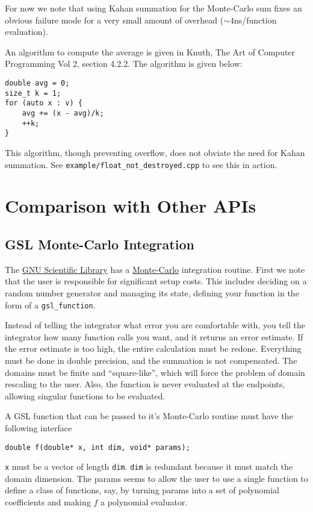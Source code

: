 \documentclass[landscape]{article}
\numberwithin{equation}{section}
\begin{document}
For now we note that using Kahan summation for the Monte-Carlo sum fixes an obvious failure mode for a very small amount of overhead (${\sim}4$ns/function evaluation).

An algorithm to compute the average is given in Knuth, The Art of Computer Programming Vol 2, section 4.2.2.
The algorithm is given below:
\begin{verbatim}
double avg = 0;
size_t k = 1;
for (auto x : v) {
	avg += (x - avg)/k;
	++k;
}
\end{verbatim}
This algorithm, though preventing overflow, does not obviate the need for Kahan summation. See \texttt{example/float\_not\_destroyed.cpp} to see this in action.

\section{Comparison with Other APIs}
\subsection{GSL Monte-Carlo Integration}

The \href{https://www.gnu.org/software/gsl/}{GNU Scientific Library} has a \href{https://www.gnu.org/software/gsl/doc/html/montecarlo.html}{Monte-Carlo} integration routine.
First we note that the user is responsible for significant setup costs.
This includes deciding on a random number generator and managing its state, defining your function in the form of a \texttt{gsl\_function}.

Instead of telling the integrator what error you are comfortable with, you tell the integrator how many function calls you want, and it returns an error estimate.
If the error estimate is too high, the entire calculation must be redone.
Everything must be done in double precision, and the summation is not compensated.
The domains must be finite and ``square-like'', which will force the problem of domain rescaling to the user. Also, the function is never evaluated at the endpoints, allowing singular functions to be evaluated.

A GSL function that can be passed to it's Monte-Carlo routine must have the following interface

\begin{verbatim}
double f(double* x, int dim, void* params);
\end{verbatim}
\texttt{x} must be a vector of length \texttt{dim}.
\texttt{dim} is redundant because it must match the domain dimension.
The params seems to allow the user to use a single function to define a class of functions, say, by turning params into a set of polynomial coefficients and making $f$ a polynomial evaluator.
\end{document}
